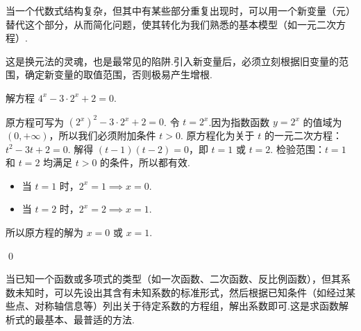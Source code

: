 	\begin{definition}[换元法]
		当一个代数式结构复杂，但其中有某些部分重复出现时，可以用一个新变量（元）替代这个部分，从而简化问题，使其转化为我们熟悉的基本模型（如一元二次方程）.
		\begin{note}
			这是换元法的灵魂，也是最常见的陷阱.引入新变量后，必须立刻根据旧变量的范围，确定新变量的取值范围，否则极易产生增根.
		\end{note}
		\begin{exercise}
			解方程 $4^x - 3 \cdot 2^x + 2 = 0$.
		\end{exercise}
		\begin{solution}
			原方程可写为 $(2^x)^2 - 3 \cdot 2^x + 2 = 0$.
			令 $t=2^x$.因为指数函数 $y=2^x$ 的值域为 $(0, +\infty)$，所以我们必须附加条件 $t>0$.
			原方程化为关于 $t$ 的一元二次方程：$t^2 - 3t + 2 = 0$.
			解得 $(t-1)(t-2)=0$，即 $t=1$ 或 $t=2$.
			检验范围：$t=1$ 和 $t=2$ 均满足 $t>0$ 的条件，所以都有效.
			\begin{itemize}
				\item 当 $t=1$ 时，$2^x=1 \implies x=0$.
				\item 当 $t=2$ 时，$2^x=2 \implies x=1$.
			\end{itemize}
			所以原方程的解为 $x=0$ 或 $x=1$.
		\end{solution}
		\qed
	\end{definition}
	
	\begin{definition}[待定系数法]
		当已知一个函数或多项式的类型（如一次函数、二次函数、反比例函数），但其系数未知时，可以先设出其含有未知系数的标准形式，然后根据已知条件（如经过某些点、对称轴信息等）列出关于待定系数的方程组，解出系数即可.这是求函数解析式的最基本、最普适的方法.
	\end{definition}